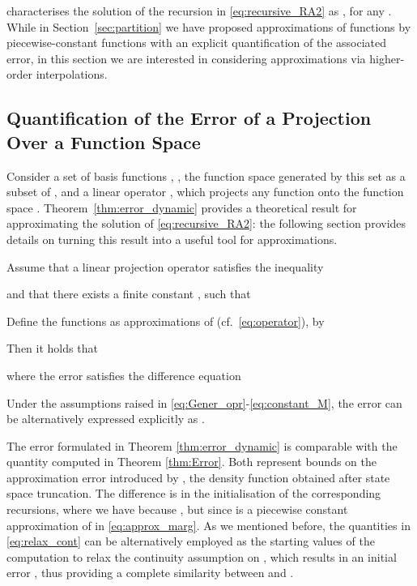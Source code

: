 \documentclass{LMCS}
\begin{document}
characterises the solution of the recursion in \eqref{eq:recursive_RA2} as
, for any .
While in Section~\ref{sec:partition} we have proposed approximations of functions  by piecewise-constant 
functions  with an explicit quantification of the associated error, 
in this section we are interested in considering approximations via higher-order interpolations.

\subsection{Quantification of the Error of a Projection Over a Function Space}

Consider a set of basis functions , ,
the function space  generated by this set as a subset of , 
and a linear operator , 
which projects any function  onto the function space .
Theorem~\ref{thm:error_dynamic} provides a theoretical result for approximating the solution of \eqref{eq:recursive_RA2}: 
the following section provides details on turning this result into a useful tool for approximations.
\begin{thm}\label{thm:error_dynamic}
Assume that a linear projection operator  satisfies the inequality

and that there exists a finite constant , 
such that

Define the functions  as approximations of  (cf. \,\eqref{eq:operator}), by

Then it holds that 

where the error  satisfies the difference equation

\end{thm}
\begin{cor}
\label{thm:dir_error}
Under the assumptions raised in \eqref{eq:Gener_opr}-\eqref{eq:constant_M}, 
the error  can be alternatively expressed explicitly as .
\end{cor}
The error  formulated in Theorem \ref{thm:error_dynamic} is comparable with the quantity  computed in Theorem \ref{thm:Error}. 
Both  represent bounds on the approximation error introduced by , 
the density function obtained after state space truncation. 
The difference is in the initialisation of the corresponding recursions, 
where we have  because , 
but  since  is a piecewise constant approximation of  in \eqref{eq:approx_marg}. 
As we mentioned before, the quantities in \eqref{eq:relax_cont} can be alternatively employed as the starting values of the computation to relax the continuity assumption on , which results in an initial error , thus providing a complete similarity between  and .
\end{document}
